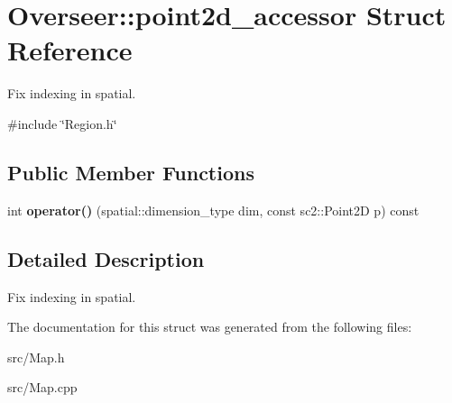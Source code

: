 \hypertarget{structOverseer_1_1point2d__accessor}{}\section{Overseer\+:\+:point2d\+\_\+accessor Struct Reference}
\label{structOverseer_1_1point2d__accessor}


Fix indexing in spatial.  




{\ttfamily \#include \char`\"{}Region.\+h\char`\"{}}

\subsection*{Public Member Functions}
\begin{DoxyCompactItemize}
\item 
int {\bfseries operator()} (spatial\+::dimension\+\_\+type dim, const sc2\+::\+Point2D p) const \hypertarget{structOverseer_1_1point2d__accessor_a739cdd045d2dd5efd6e5788f181ff807}{}\label{structOverseer_1_1point2d__accessor_a739cdd045d2dd5efd6e5788f181ff807}

\end{DoxyCompactItemize}


\subsection{Detailed Description}
Fix indexing in spatial. 

The documentation for this struct was generated from the following files\+:\begin{DoxyCompactItemize}
\item 
src/Map.\+h\item 
src/Map.\+cpp\end{DoxyCompactItemize}
